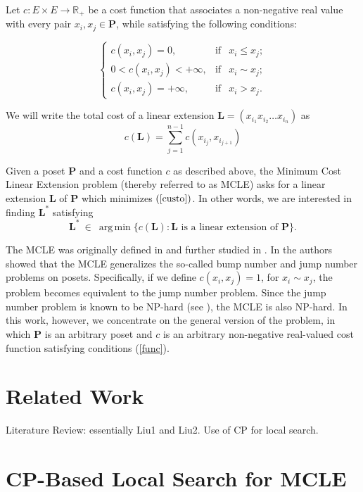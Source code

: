 \documentclass{llncs}
\DeclareMathOperator*{\argmin}{arg\,min}
\begin{document}
Let $c: E \times E \rightarrow \mathbb{R}_+$ be a cost function that associates a non-negative real value with every pair $x_i,x_j \in \mathbf{P}$, while satisfying the following conditions:

\begin{equation}
\left\{
\begin{array}{lll}
c(x_i,x_j)=0, & \mbox{if} & x_i \leq x_j;\\
0< c(x_i,x_j)< +\infty, & \mbox{if} & x_i \sim x_j;\\
c(x_i,x_j)=+\infty, & \mbox{if} & x_i>x_j.
\end{array}
\label{func} \right.
\end{equation}

We will write the total cost of a linear extension ${\mathbf L}=\left(x_{i_1} x_{i_2} \ldots x_{i_n}\right)$ as
\begin{equation}
\label{custo} \displaystyle c({\mathbf L})=\sum_{j=1}^{n-1}c(x_{i_j}, x_{i_{j+1}})
\end{equation}

Given a poset $\mathbf P$ and a cost function $c$ as described above, the Minimum Cost Linear Extension problem (thereby referred to as MCLE) asks for a linear extension $\mathbf L$ of $\mathbf P$ which minimizes $(\ref{custo})$. In other words, we are interested in finding $\mathbf{L}^*$ satisfying
\[
\mathbf{L}^* \:\in\: \argmin \{c(\mathbf{L}) : \mathbf{L} \mbox{ is a linear extension of } {\mathbf P} \}.
\]

The MCLE was originally defined in \cite{Liu} and further studied in \cite{Wu}.
In \cite{Liu} the authors showed that the MCLE
generalizes the so-called bump number and jump number problems on posets.
Specifically, if we define $c(x_i,x_j)=1$, for $x_i \sim x_j$, the problem becomes
equivalent to the jump number problem. Since the jump number problem is known to be NP-hard (see \cite{Bouchitte}), the MCLE is also NP-hard.
In this work, however, we concentrate on the general version of the problem, in
which $\mathbf P$ is an arbitrary poset and $c$ is an arbitrary non-negative real-valued cost function satisfying conditions (\ref{func}).


\section{Related Work}

Literature Review: essentially Liu1 and Liu2. Use of CP for local search.

\section{CP-Based Local Search for MCLE}
\end{document}
